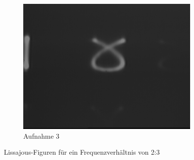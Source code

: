 \documentclass[bigchapter,colorback,accentcolor=tud4b,linedtoc,11pt]{tudreport}
\begin{document}
\begin{figure}[H]
\begin{subfigure}[h]{0.32\textwidth}
    \includegraphics[width=\textwidth]{data/Aufgabe7/2-3-y.png}
    \caption[Cap for listoffigures]{Aufnahme 3}
  \end{subfigure}%
  \caption{Lissajous-Figuren für ein Frequenzverhältnis von 2:3}
\end{figure}
\end{document}
